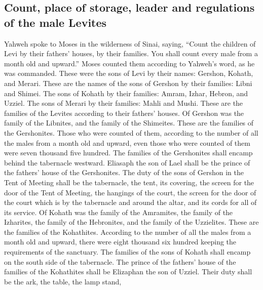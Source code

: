 \hypertarget{count-place-of-storage-leader-and-regulations-of-the-male-levites}{%
\subsection{Count, place of storage, leader and regulations of the male
Levites}\label{count-place-of-storage-leader-and-regulations-of-the-male-levites}}

 Yahweh spoke to Moses in the wilderness of Sinai,
saying,  ``Count the children of Levi by their fathers'
houses, by their families. You shall count every male from a month old
and upward.''  Moses counted them according to Yahweh's
word, as he was commanded.  These were the sons of Levi
by their names: Gershon, Kohath, and Merari.  These are
the names of the sons of Gershon by their families: Libni and Shimei.
 The sons of Kohath by their families: Amram, Izhar,
Hebron, and Uzziel.  The sons of Merari by their
families: Mahli and Mushi. These are the families of the Levites
according to their fathers' houses.  Of Gershon was the
family of the Libnites, and the family of the Shimeites. These are the
families of the Gershonites.  Those who were counted of
them, according to the number of all the males from a month old and
upward, even those who were counted of them were seven thousand five
hundred.  The families of the Gershonites shall encamp
behind the tabernacle westward.  Eliasaph the son of Lael
shall be the prince of the fathers' house of the Gershonites.
 The duty of the sons of Gershon in the Tent of Meeting
shall be the tabernacle, the tent, its covering, the screen for the door
of the Tent of Meeting,  the hangings of the court, the
screen for the door of the court which is by the tabernacle and around
the altar, and its cords for all of its service.  Of
Kohath was the family of the Amramites, the family of the Izharites, the
family of the Hebronites, and the family of the Uzzielites. These are
the families of the Kohathites.  According to the number
of all the males from a month old and upward, there were eight thousand
six hundred keeping the requirements of the sanctuary. 
The families of the sons of Kohath shall encamp on the south side of the
tabernacle.  The prince of the fathers' house of the
families of the Kohathites shall be Elizaphan the son of Uzziel.
 Their duty shall be the ark, the table, the lamp stand,
